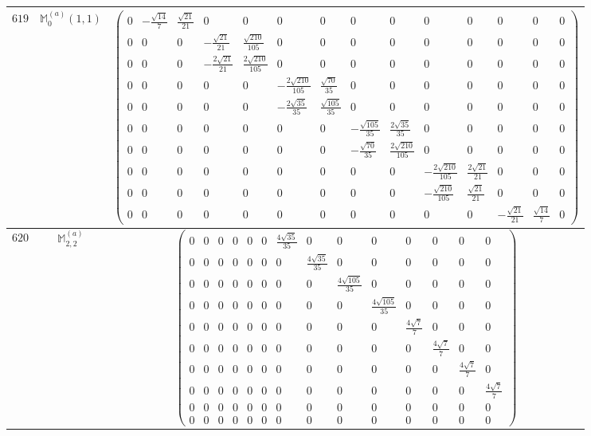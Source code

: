 \documentclass[fleqn,8pt,landscape]{jsarticle}
\begin{document}
\begin{center}
\begin{longtable}{ccc}
$ 619 $ & $ \mathbb{M}_{0}^{(a)}(1,1) $ & $ \begin{pmatrix} 0 & - \frac{\sqrt{14}}{7} & \frac{\sqrt{21}}{21} & 0 & 0 & 0 & 0 & 0 & 0 & 0 & 0 & 0 & 0 & 0 \\ 0 & 0 & 0 & - \frac{\sqrt{21}}{21} & \frac{\sqrt{210}}{105} & 0 & 0 & 0 & 0 & 0 & 0 & 0 & 0 & 0 \\ 0 & 0 & 0 & - \frac{2 \sqrt{21}}{21} & \frac{2 \sqrt{210}}{105} & 0 & 0 & 0 & 0 & 0 & 0 & 0 & 0 & 0 \\ 0 & 0 & 0 & 0 & 0 & - \frac{2 \sqrt{210}}{105} & \frac{\sqrt{70}}{35} & 0 & 0 & 0 & 0 & 0 & 0 & 0 \\ 0 & 0 & 0 & 0 & 0 & - \frac{2 \sqrt{35}}{35} & \frac{\sqrt{105}}{35} & 0 & 0 & 0 & 0 & 0 & 0 & 0 \\ 0 & 0 & 0 & 0 & 0 & 0 & 0 & - \frac{\sqrt{105}}{35} & \frac{2 \sqrt{35}}{35} & 0 & 0 & 0 & 0 & 0 \\ 0 & 0 & 0 & 0 & 0 & 0 & 0 & - \frac{\sqrt{70}}{35} & \frac{2 \sqrt{210}}{105} & 0 & 0 & 0 & 0 & 0 \\ 0 & 0 & 0 & 0 & 0 & 0 & 0 & 0 & 0 & - \frac{2 \sqrt{210}}{105} & \frac{2 \sqrt{21}}{21} & 0 & 0 & 0 \\ 0 & 0 & 0 & 0 & 0 & 0 & 0 & 0 & 0 & - \frac{\sqrt{210}}{105} & \frac{\sqrt{21}}{21} & 0 & 0 & 0 \\ 0 & 0 & 0 & 0 & 0 & 0 & 0 & 0 & 0 & 0 & 0 & - \frac{\sqrt{21}}{21} & \frac{\sqrt{14}}{7} & 0 \end{pmatrix} $ \\ \hline
$ 620 $ & $ \mathbb{M}_{2,2}^{(a)} $ & $ \begin{pmatrix} 0 & 0 & 0 & 0 & 0 & 0 & \frac{4 \sqrt{35}}{35} & 0 & 0 & 0 & 0 & 0 & 0 & 0 \\ 0 & 0 & 0 & 0 & 0 & 0 & 0 & \frac{4 \sqrt{35}}{35} & 0 & 0 & 0 & 0 & 0 & 0 \\ 0 & 0 & 0 & 0 & 0 & 0 & 0 & 0 & \frac{4 \sqrt{105}}{35} & 0 & 0 & 0 & 0 & 0 \\ 0 & 0 & 0 & 0 & 0 & 0 & 0 & 0 & 0 & \frac{4 \sqrt{105}}{35} & 0 & 0 & 0 & 0 \\ 0 & 0 & 0 & 0 & 0 & 0 & 0 & 0 & 0 & 0 & \frac{4 \sqrt{7}}{7} & 0 & 0 & 0 \\ 0 & 0 & 0 & 0 & 0 & 0 & 0 & 0 & 0 & 0 & 0 & \frac{4 \sqrt{7}}{7} & 0 & 0 \\ 0 & 0 & 0 & 0 & 0 & 0 & 0 & 0 & 0 & 0 & 0 & 0 & \frac{4 \sqrt{7}}{7} & 0 \\ 0 & 0 & 0 & 0 & 0 & 0 & 0 & 0 & 0 & 0 & 0 & 0 & 0 & \frac{4 \sqrt{7}}{7} \\ 0 & 0 & 0 & 0 & 0 & 0 & 0 & 0 & 0 & 0 & 0 & 0 & 0 & 0 \\ 0 & 0 & 0 & 0 & 0 & 0 & 0 & 0 & 0 & 0 & 0 & 0 & 0 & 0 \end{pmatrix} $ \\ \hline

\end{longtable}
\end{center}
\end{document}
